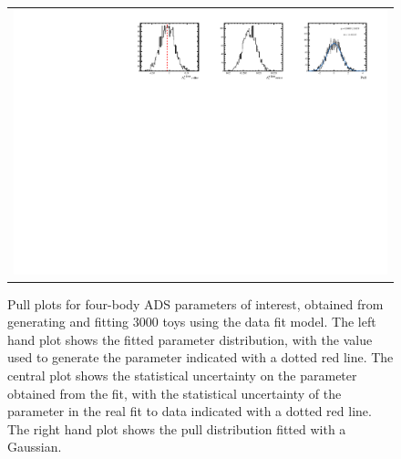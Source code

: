 \begin{figure}
\begin{tabular}{c}
\includegraphics[width=\textwidth]{ANA_resources/Plots/Data_fit/FitterBias//A_Bs_piKpipi.pdf} \\
  \end{tabular}
  \caption{Pull plots for four-body ADS parameters of interest, obtained from generating and fitting 3000 toys using the data fit model. The left hand plot shows the fitted parameter distribution, with the value used to generate the parameter indicated with a dotted red line. The central plot shows the statistical uncertainty on the parameter obtained from the fit, with the statistical uncertainty of the parameter in the real fit to data indicated with a dotted red line. The right hand plot shows the pull distribution fitted with a Gaussian.}
\label{fig:fourBody_ADS_pulls}
\end{figure}
